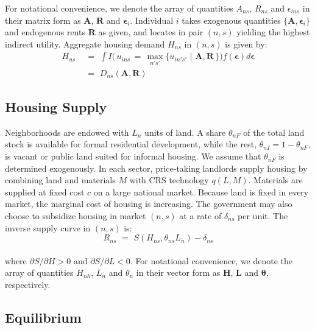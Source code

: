 \documentclass[12pt]{article}
\begin{document}
 For notational convenience, we denote the array of quantities $A_{ns}$, $R_{ns}$ and $\epsilon_{ins}$ in their matrix form as $\bm{A}$, $\bm{R}$ and $\bm{\epsilon}_i$. Individual $i$ takes exogenous quantities $\{\bm{A},\bm{\epsilon}_i\}$ and endogenous rents $\bm{R}$ as given, and locates in pair $(n,s)$ yielding the highest indirect utility. Aggregate housing demand $H_{ns}$ in $(n,s)$ is given by:
\begin{equation*}
\begin{aligned}
H_{ns} \,\,& =\,\, \int I\Big( \, u_{ins} \,=\, \max_{n's'}\{u_{in' s'} \,\,|\,\, \bm{A},\bm{R}\,\} \Big)f(\bm{\epsilon}) d\bm{\epsilon}    \\[.2em]
        \,\,& =\,\, D_{ns}(\bm{A},\bm{R})
\end{aligned}
\end{equation*}


\subsection*{Housing Supply}

 Neighborhoods are endowed with $L_n$ units of land. A share $\theta_{nF}$ of the total land stock is available for formal residential development, while the rest, $\theta_{nI} = 1-\theta_{nF}$, is vacant or public land suited for informal housing. We assume that $\theta_{nF}$ is determined exogenously. In each sector, price-taking landlords supply housing by combining land and materials $M$ with CRS technology $q(L,M)$. Materials are supplied at fixed cost $c$ on a large national market. Because land is fixed in every market, the marginal cost of housing is increasing. The government may also choose to subsidize housing in market $(n,s)$ at a rate of $\delta_{ns}$ per unit. The inverse supply curve in $(n,s)$ is:
\begin{equation*}
R_{ns} \,\, =\,\, S(H_{ns},\theta_{ns}L_n) - \delta_{ns}
\end{equation*} \\[-1.99em]
 where $\partial S/\partial H > 0$ and $\partial S/\partial L < 0$. For notational convenience, we denote the array of quantities $H_{nh}$, $L_n$ and $\theta_n$ in their vector form as $\bm{H}$, $\bm{L}$ and $\bm{\theta}$, respectively.

\subsection*{Equilibrium}
\end{document}
